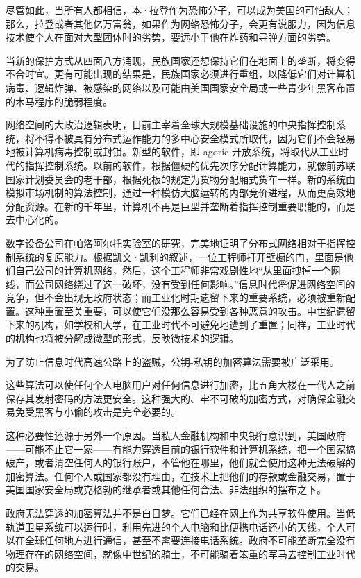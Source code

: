 尽管如此，当所有人都相信，本·拉登作为恐怖分子，可以成为美国的可怕敌人；那么，拉登或者其他亿万富翁，如果作为网络恐怖分子，会更有说服力，因为信息技术使个人在面对大型团体时的劣势，要远小于他在炸药和导弹方面的劣势。

当新的保护方式从四面八方涌现，民族国家还想保持它们在地面上的垄断，将变得不合时宜。更有可能出现的结果是，民族国家必须进行重组，以降低它们对计算机病毒、逻辑炸弹、被感染的网络以及可能由美国国家安全局或一些青少年黑客布置的木马程序的脆弱程度。

网络空间的大政治逻辑表明，目前主宰着全球大规模基础设施的中央指挥控制系统，将不得不被具有分布式运作能力的多中心安全模式所取代，因为它们不会轻易地被计算机病毒控制或封锁。新型的软件，即 agoric 开放系统，将取代从工业时代的指挥控制系统。以前的软件，根据僵硬的优先次序分配计算能力，就像前苏联国家计划委员会的老干部，根据死板的规定为货物分配厢式货车一样。新的系统由模拟市场机制的算法控制，通过一种模仿大脑运转的内部竞价进程，从而更高效地分配资源。在新的千年里，计算机不再是巨型并垄断着指挥控制重要职能的，而是去中心化的。

数字设备公司在帕洛阿尔托实验室的研究，完美地证明了分布式网络相对于指挥控制系统的复原能力。根据凯文·凯利的叙述，一位工程师打开壁橱的门，里面是他们自己公司的计算机网络，然后，这个工程师非常戏剧性地“从里面拽掉一个网线，而公司网络绕过了这一破坏，没有受到任何影响。”信息时代将促进网络空间的竞争，但不会出现无政府状态；而工业化时期遗留下来的重要系统，必须被重新配置。这种重置至关重要，可以使它们没那么容易受到各种恶意的攻击。中世纪遗留下来的机构，如学校和大学，在工业时代不可避免地遭到了重置；同样，工业时代的机构也将被分解成微型的形式，反映微技术的逻辑。

为了防止信息时代高速公路上的盗贼，公钥-私钥的加密算法需要被广泛采用。

这些算法可以使任何个人电脑用户对任何信息进行加密，比五角大楼在一代人之前保存其发射密码的方法更安全。这种强大的、牢不可破的加密方式，对确保金融交易免受黑客与小偷的攻击是完全必要的。

这种必要性还源于另外一个原因。当私人金融机构和中央银行意识到，美国政府——可能不止它一家——有能力穿透目前的银行软件和计算机系统，把一个国家搞破产，或者清空任何人的银行账户，不管他在哪里，他们就会使用这种无法破解的加密算法。任何个人或国家都没有理由，在技术上把他们的存款或金融交易，置于美国国家安全局或克格勃的继承者或其他任何合法、非法组织的摆布之下。

政府无法穿透的加密算法并不是白日梦。它们已经在网上作为共享软件使用。当低轨道卫星系统可以运行时，利用先进的个人电脑和比便携电话还小的天线，个人可以在全球任何地方进行通信，甚至不需要连接电话系统。政府不可能垄断完全没有物理存在的网络空间，就像中世纪的骑士，不可能骑着笨重的军马去控制工业时代的交易。

